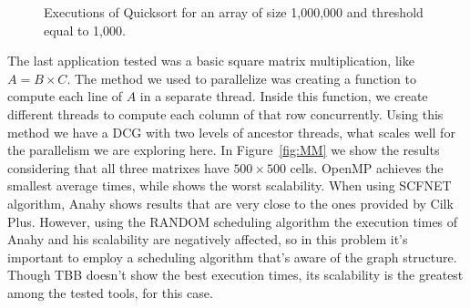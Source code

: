 \documentclass[twocolumn]{svjour3}
\begin{document}
\begin{figure}

\caption{Executions of Quicksort for an array of size 1,000,000 and threshold equal to 1,000.}
\label{fig:QS}
\end{figure}


The last application tested was a basic square matrix multiplication, like $A = B \times C$. The method we used to parallelize was creating a function to compute each line of $A$ in a separate thread. Inside this function, we create different threads to compute each column of that row concurrently. Using this method we have a DCG with two levels of ancestor threads, what scales well for the parallelism we are exploring here. In Figure~\ref{fig:MM} we show the results considering that all three matrixes have $500 \times 500$ cells. OpenMP achieves the smallest average times, while shows the worst scalability. When using SCFNET algorithm, Anahy shows results that are very close to the ones provided by Cilk Plus. However, using the RANDOM scheduling algorithm the execution times of Anahy and his scalability are negatively affected, so in this problem it's important to employ a scheduling algorithm that's aware of the graph structure. Though TBB doesn't show the best execution times, its scalability is the greatest among the tested tools, for this case.
\end{document}
